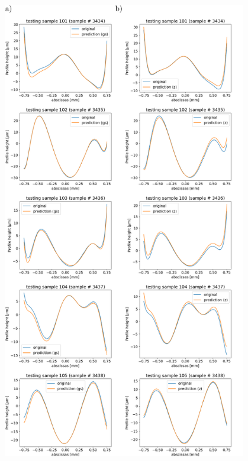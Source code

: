 \documentclass{iucr}
\begin{document}
\begin{figure}\label{fig:v14profiles}
    \includegraphics[width=0.95\textwidth]{figures/figure4.pdf}



\end{figure}
\end{document}
